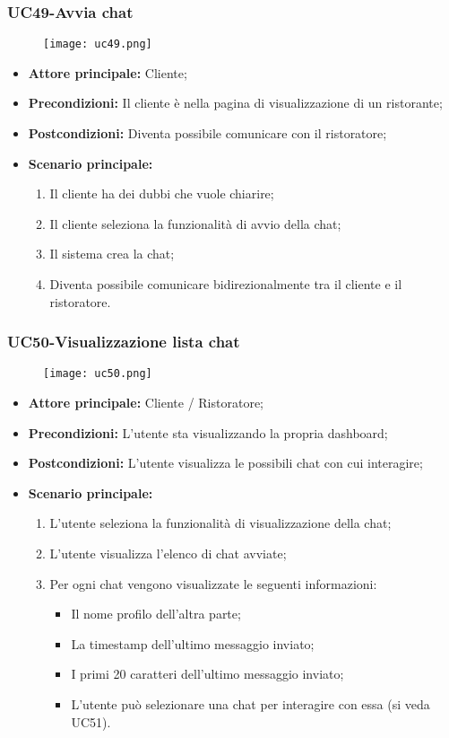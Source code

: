 \nonstopmode
\pagebreak
\subsubsection{UC49-Avvia chat}
\begin{figure}[h] \texttt{[image: uc49.png]} \end{figure}
\begin{itemize}
\item \textbf{Attore principale:} Cliente;
\item \textbf{Precondizioni:} Il cliente è nella pagina di visualizzazione di un ristorante;
\item \textbf{Postcondizioni:} Diventa possibile comunicare con il ristoratore;
\item \textbf{Scenario principale:}
\begin{enumerate}
    \item Il cliente ha dei dubbi che vuole chiarire;
    \item Il cliente seleziona la funzionalità di avvio della chat;
    \item Il sistema crea la chat;
    \item Diventa possibile comunicare bidirezionalmente tra il cliente e il ristoratore.
\end{enumerate}
\end{itemize}

\subsubsection{UC50-Visualizzazione lista chat}
\begin{figure}[h] \texttt{[image: uc50.png]} \end{figure}
\begin{itemize}
\item \textbf{Attore principale:} Cliente / Ristoratore;
\item \textbf{Precondizioni:} L'utente sta visualizzando la propria dashboard;
\item \textbf{Postcondizioni:} L'utente visualizza le possibili chat con cui interagire;
\item \textbf{Scenario principale:}
\begin{enumerate}
    \item L'utente seleziona la funzionalità di visualizzazione della chat;
    \item L'utente visualizza l'elenco di chat avviate;
    \item Per ogni chat vengono visualizzate le seguenti informazioni:
      \begin{itemize}
        \item Il nome profilo dell'altra parte;
        \item La timestamp dell'ultimo messaggio inviato;
        \item I primi 20 caratteri dell'ultimo messaggio inviato;
\item L'utente può selezionare una chat per interagire con essa (si veda UC51).
      \end{itemize}
\end{enumerate}
\end{itemize}

